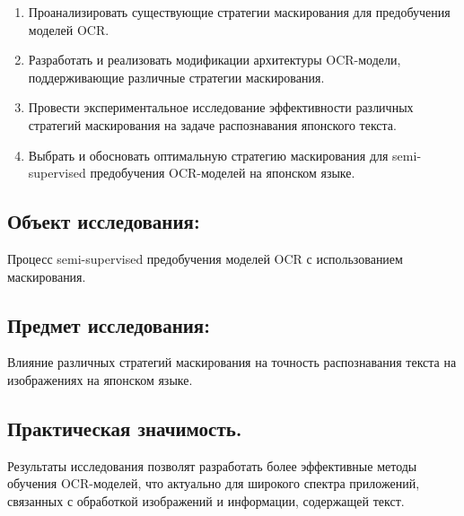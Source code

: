 \begin{enumerate}
  \item Проанализировать существующие  стратегии  маскирования  для предобучения моделей  OCR.
  \item Разработать  и  реализовать  модификации  архитектуры  OCR-модели,  поддерживающие  различные  стратегии  маскирования.
  \item Провести  экспериментальное  исследование  эффективности  различных  стратегий  маскирования  на  задаче  распознавания  японского текста.
  \item Выбрать  и  обосновать  оптимальную  стратегию  маскирования  для semi-supervised  предобучения  OCR-моделей  на  японском  языке. 
\end{enumerate}

\subsection{Объект исследования:} Процесс semi-supervised предобучения моделей  OCR  с  использованием  маскирования.

\subsection{Предмет исследования:}  Влияние  различных  стратегий  маскирования  на  точность  распознавания  текста  на  изображениях  на  японском языке.

\subsection{Практическая значимость.} 

Результаты  исследования  позволят  разработать  более  эффективные  методы  обучения  OCR-моделей,  что  актуально  для  широкого  спектра  приложений,  связанных  с  обработкой  изображений  и  информации,  содержащей  текст.

\newpage

